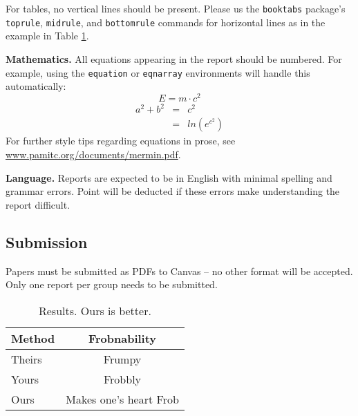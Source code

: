 \documentclass[10pt,twocolumn,letterpaper]{article}
\newcommand{\xhdr}[1]{\vspace{3pt}\noindent\textbf{#1}}
\begin{document}
For tables, no vertical lines should be present. Please us the \texttt{booktabs} package's \texttt{toprule}, \texttt{midrule}, and \texttt{bottomrule} commands for horizontal lines as in the example in Table \ref{tab:example}.




\xhdr{Mathematics.} All equations appearing in the report should be numbered. For example, using the \texttt{equation} or \texttt{eqnarray} environments will handle this automatically:
%
\begin{equation}
  E = m\cdot c^2
  \label{eq:important}
\end{equation}
%
\begin{eqnarray}
a^2 + b^2 &=& c^2\\
         &=& ln(e^{c^2})
\end{eqnarray}
%
For further style tips regarding equations in prose, see \url{www.pamitc.org/documents/mermin.pdf}.

\xhdr{Language.} Reports are expected to be in English with minimal spelling and grammar errors. Point will be deducted if these errors make understanding the report difficult.

\subsection{Submission}
Papers must be submitted as PDFs to Canvas -- no other format will be accepted. Only one report per group needs to be submitted.





\begin{table}[t]
  \centering
  \begin{tabular}{@{}lc@{}}
    \toprule
    Method & Frobnability \\
    \midrule
    Theirs & Frumpy \\
    Yours & Frobbly \\
    Ours & Makes one's heart Frob\\
    \bottomrule
  \end{tabular}
  \caption{Results.   Ours is better.}
  \label{tab:example}
\end{table}






{\small


}
\end{document}
